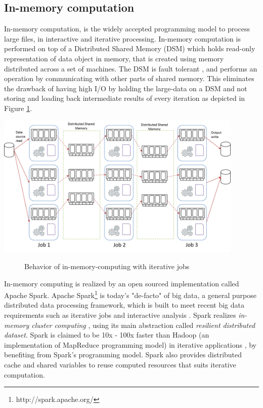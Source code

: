 \subsection{In-memory computation}
In-memory computation, is the widely accepted programming model to process large files, in interactive and iterative processing. In-memory computation is performed on top of a Distributed Shared Memory (DSM) which holds read-only representation of data object in memory, that is created using memory distributed across a set of machines. The DSM is fault tolerant \cite{RDD}, and performs an operation by communicating with other parts of shared memory. This eliminates the drawback of having high I/O by holding the large-data on a DSM and not storing and loading back intermediate results of every iteration as depicted in Figure \ref{fig:in-memory-computing}.
 \begin{center}
	\includegraphics[width=32em]{./Figures/in-memory-computing}
	\begin{figure}[htbp]
    \caption{Behavior of in-memory-computing with iterative jobs}
    \label{fig:in-memory-computing}
	\end{figure}
\end{center} 
In-memory computing is realized by an open sourced implementation called Apache Spark. Apache Spark\footnote{http://spark.apache.org/} is today's "de-facto" of big data, a general purpose distributed data processing framework, which is built to meet recent big data requirements such as iterative jobs and interactive analysis \cite{Spark}. Spark realizes \textit{in-memory cluster computing} \cite{RDD} , using its main abstraction called \textit{resilient distributed dataset}.
Spark is claimed to be 10x - 100x faster than Hadoop (an implementation of MapReduce programming model) in iterative applications \cite{Spark}\cite{RDD}\citep{clashoftitians}\cite{Spark-improvements}, by benefiting from Spark's programming model. Spark also provides distributed cache and shared variables to reuse computed resources that suits iterative computation. 
